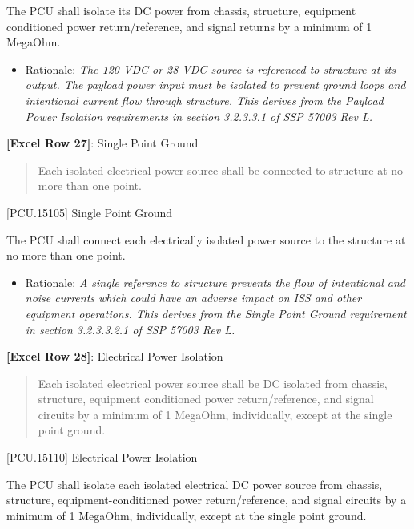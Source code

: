 The PCU shall isolate its DC power from chassis, structure, equipment conditioned power return\slash reference, and signal returns by a minimum of 1 MegaOhm.

\begin{itemize}
\item{} Rationale: \emph{The 120 VDC or 28 VDC source is referenced to structure at its output. The payload power input must be isolated to prevent ground loops and intentional current flow through structure. This derives from the Payload Power Isolation requirements in section 3.2.3.3.1 of SSP 57003 Rev L.}

\end{itemize}

\textbf{[Excel Row 27]}: Single Point Ground

\begin{quote}
Each isolated electrical power source shall be connected to structure at no more than one point.
\end{quote}

[PCU.15105] Single Point Ground

The PCU shall connect each electrically isolated power source to the structure at no more than one point.

\begin{itemize}
\item{} Rationale: \emph{A single reference to structure prevents the flow of intentional and noise currents which could have an adverse impact on ISS and other equipment operations. This derives from the Single Point Ground requirement in section 3.2.3.3.2.1 of SSP 57003 Rev L.}

\end{itemize}

\textbf{[Excel Row 28]}: Electrical Power Isolation

\begin{quote}
Each isolated electrical power source shall be DC isolated from chassis, structure, equipment conditioned power return\slash reference, and signal circuits by a minimum of 1 MegaOhm, individually, except at the single point ground.
\end{quote}

[PCU.15110] Electrical Power Isolation

The PCU shall isolate each isolated electrical DC power source from chassis, structure, equipment-conditioned power return\slash reference, and signal circuits by a minimum of 1 MegaOhm, individually, except at the single point ground.

